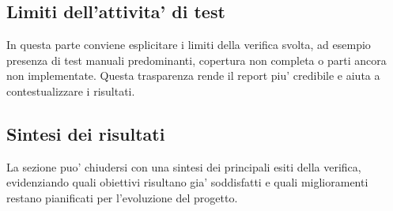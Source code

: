 \subsection{Limiti dell'attivita' di test}

In questa parte conviene esplicitare i limiti della verifica svolta, ad esempio presenza di test manuali predominanti, copertura non completa o parti ancora non implementate. Questa trasparenza rende il report piu' credibile e aiuta a contestualizzare i risultati.

\subsection{Sintesi dei risultati}

La sezione puo' chiudersi con una sintesi dei principali esiti della verifica, evidenziando quali obiettivi risultano gia' soddisfatti e quali miglioramenti restano pianificati per l'evoluzione del progetto.